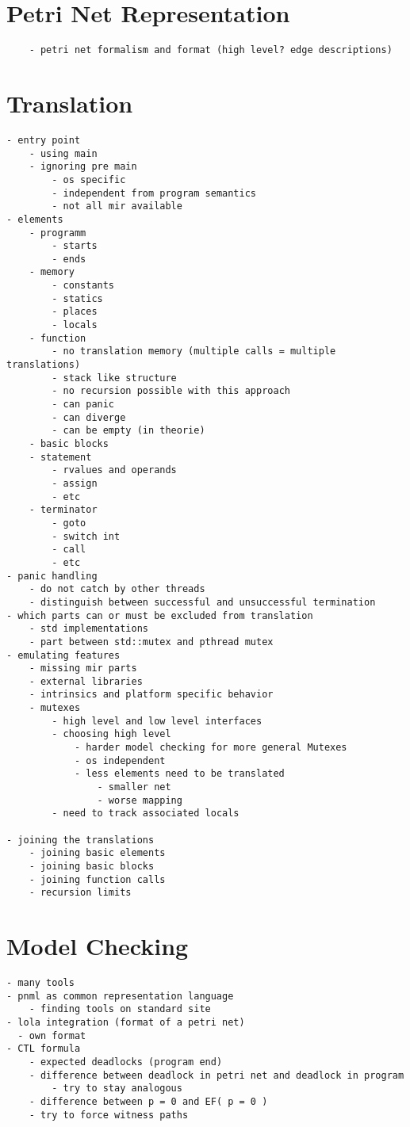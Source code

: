 \section{Petri Net Representation}
\label{app_petri}
\begin{verbatim}
    - petri net formalism and format (high level? edge descriptions)
\end{verbatim}

\section{Translation}
\label{app_trans}
\begin{verbatim}
- entry point
    - using main
    - ignoring pre main
        - os specific
        - independent from program semantics
        - not all mir available
- elements
    - programm
        - starts
        - ends
    - memory
        - constants
        - statics
        - places
        - locals
    - function
        - no translation memory (multiple calls = multiple translations)
        - stack like structure
        - no recursion possible with this approach
        - can panic
        - can diverge
        - can be empty (in theorie)
    - basic blocks
    - statement
        - rvalues and operands
        - assign
        - etc
    - terminator
        - goto
        - switch int
        - call
        - etc
- panic handling
    - do not catch by other threads
    - distinguish between successful and unsuccessful termination
- which parts can or must be excluded from translation
    - std implementations
    - part between std::mutex and pthread mutex
- emulating features
    - missing mir parts
    - external libraries
    - intrinsics and platform specific behavior
    - mutexes
        - high level and low level interfaces
        - choosing high level
            - harder model checking for more general Mutexes
            - os independent
            - less elements need to be translated
                - smaller net
                - worse mapping
        - need to track associated locals

- joining the translations
    - joining basic elements
    - joining basic blocks
    - joining function calls
    - recursion limits
\end{verbatim}


\section{Model Checking}
\label{app_mc}
\begin{verbatim}
- many tools
- pnml as common representation language
    - finding tools on standard site
- lola integration (format of a petri net)
  - own format
- CTL formula
    - expected deadlocks (program end)
    - difference between deadlock in petri net and deadlock in program
        - try to stay analogous
    - difference between p = 0 and EF( p = 0 )
    - try to force witness paths
\end{verbatim}


